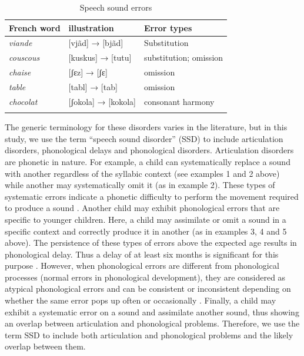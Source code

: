 \documentclass[output=paper,newtxmath,modfonts,nonflat,draftmode]{langsci/langscibook}
\begin{document}
\begin{table}
\caption{Speech sound errors\label{tab:takam:0}}
\begin{tabularx}{\textwidth}{XXX}
\lsptoprule
{French} {word}  & {illustration} & {Error} {types}\\
\midrule
\textit{viande}  & [vjãd] → [bjãd] & Substitution \\
\textit{couscous}  & [kuskus] → [tutu] & substitution; omission\\
\textit{chaise}  & [ʃɛz] → [ʃɛ] & omission\\
\textit{table}  & [tabl] → [tab] & omission\\
\textit{chocolat}  & [ʃokola] → [kokola] & consonant harmony\\
\lspbottomrule
\end{tabularx}
\end{table}


The generic terminology for these disorders varies in the literature, but in this study, we use the term “speech sound disorder” (SSD) to include articulation disorders, phonological delays and phonological disorders. Articulation disorders are phonetic in nature. For example, a child can systematically replace a sound with another regardless of the syllabic context (see examples 1 and 2 above) while another may systematically omit it (as in example 2). These types of systematic errors indicate a phonetic difficulty to perform the movement required to produce a sound \citep{Fox2001}. Another child may exhibit phonological errors that are specific to younger children. Here, a child may assimilate or omit a sound in a specific context and correctly produce it in another (as in examples 3, 4 and 5 above). The persistence of these types of errors above the expected age results in phonological delay. Thus a delay of at least six months is significant for this purpose \citep{Dodd2013}.%
However, when phonological errors are different from phonological processes (normal errors in phonological development), they are considered as atypical phonological errors and can be consistent or inconsistent depending on whether the same error pops up often or occasionally \citep{Dodd2013}. Finally, a child may exhibit a systematic error on a sound and assimilate another sound, thus showing an overlap between articulation and phonological problems. Therefore, we use the term SSD to include both articulation and phonological problems and the likely overlap between them.
\end{document}
